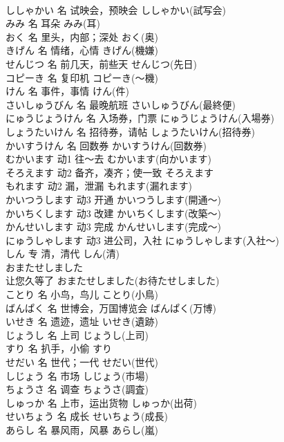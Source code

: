 \documentclass[8pt]{extreport}
\begin{document}
\begin{CJK}{UTF8}{min}
\\	ししゃかい	名	试映会，预映会	ししゃかい(試写会)	
\\	みみ	名	耳朵	みみ(耳)	
\\	おく	名	里头，内部；深处	おく(奥)	
\\	きげん	名	情绪，心情	きげん(機嫌)	
\\	せんじつ	名	前几天，前些天	せんじつ(先日)	
\\	コピーき	名	复印机	コピーき(～機)	
\\	けん	名	事件，事情	けん(件)	
\\	さいしゅうびん	名	最晚航班	さいしゅうびん(最終便)	
\\	にゅうじょうけん	名	入场券，门票	にゅうじょうけん(入場券)	
\\	しょうたいけん	名	招待券，请帖	しょうたいけん(招待券)	
\\	かいすうけん	名	回数券	かいすうけん(回数券)	
\\	むかいます	动1	往～去	むかいます(向かいます)	
\\	そろえます	动2	备齐，凑齐；使一致	そろえます	
\\	もれます	动2	漏，泄漏	もれます(漏れます)	
\\	かいつうします	动3	开通	かいつうします(開通～)	
\\	かいちくします	动3	改建	かいちくします(改築～)	
\\	かんせいします	动3	完成	かんせいします(完成～)	
\\	にゅうしゃします	动3	进公司，入社	にゅうしゃします(入社～)	
\\	しん	专	清，清代	しん(清)	
\\	おまたせしました	
\\	让您久等了	おまたせしました(お待たせしました)	
\\	ことり	名	小鸟，鸟儿	ことり(小鳥)	
\\	ばんぱく	名	世博会，万国博览会	ばんぱく(万博)	
\\	いせき	名	遗迹，遗址	いせき(遺跡)	
\\	じょうし	名	上司	じょうし(上司)	
\\	すり	名	扒手，小偷	すり	
\\	せだい	名	世代；一代	せだい(世代)	
\\	しじょう	名	市场	しじょう(市場)	
\\	ちょうさ	名	调查	ちょうさ(調査)	
\\	しゅっか	名	上市，运出货物	しゅっか(出荷)	
\\	せいちょう	名	成长	せいちょう(成長)	
\\	あらし	名	暴风雨，风暴	あらし(嵐)	

\end{CJK}
\end{document}
